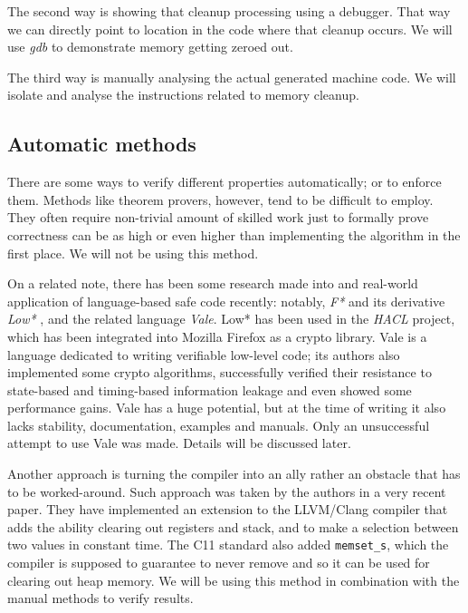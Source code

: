 \documentclass[a4paper,10pt,openright]{memoir}
\newcommand{\term}[1]{\textit{#1}}
\newcommand{\code}[1]{\texttt{#1}}
\begin{document}
The second way is showing that cleanup processing using a debugger. 
That way we can directly point to location in the code where that 
cleanup occurs. We will use \term{gdb} to demonstrate memory getting 
zeroed out.

The third way is manually analysing the actual generated machine code. 
We will isolate and analyse the instructions related to memory cleanup.

\subsection{Automatic methods}
\label{sec:verifmet}

There are some ways to verify different properties automatically; or to 
enforce them. Methods like theorem provers, however, tend to be 
difficult to employ. They often require non-trivial amount of skilled 
work just to formally prove correctness can be as high or even higher 
than implementing the algorithm in the first place.  We will not be using this method.

On a related note, there has been some research made into and 
real-world application of language-based safe code recently: notably, 
\term{F*} and its derivative \term{Low*} \cite{Low*}, and the related 
language \term{Vale}\cite{vale2017}. Low* has been used in the 
\term{HACL} project, which has been integrated into Mozilla Firefox as 
a crypto library. Vale is a language dedicated to writing verifiable 
low-level code; its authors also implemented some crypto algorithms, 
successfully verified their resistance to state-based and timing-based 
information leakage and even showed some performance gains. Vale has a 
huge potential, but at the time of writing it also lacks stability, 
documentation, examples and manuals. Only an unsuccessful attempt to 
use Vale was made. Details will be discussed later. 

Another approach is turning the compiler into an ally rather an 
obstacle that has to be worked-around. Such approach was taken by the 
authors in a very recent paper\cite{whatyouc}. They have implemented an 
extension to the LLVM/Clang compiler that adds the ability clearing out 
registers and stack, and to make a selection between two values in 
constant time. The C11 standard also added \code{memset\_s}, which the 
compiler is supposed to guarantee to never remove and so it can be used 
for clearing out heap memory. We will be using this method in 
combination with the manual methods to verify results.
\end{document}
